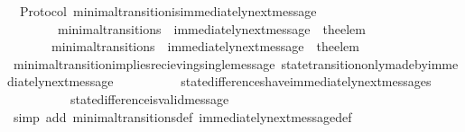 \begin{isabellebody}
\isanewline
%
\endisadelimproof
\isanewline
\isanewline
{}\isamarkupfalse%
\ {\isacharparenleft}\ Protocol{\isacharparenright}\ minimal{\isacharunderscore}transition{\isacharunderscore}is{\isacharunderscore}immediately{\isacharunderscore}next{\isacharunderscore}message\ {\isacharcolon}\isanewline
\ \ {\isachardoublequoteopen}{\isasymforall}\ {\isasymsigma}\ {\isasymsigma}{\isacharprime}{\isachardot}\ {\isacharparenleft}{\isasymsigma}{\isacharcomma}\ {\isasymsigma}{\isacharprime}{\isacharparenright}\ {\isasymin}\ minimal{\isacharunderscore}transitions\ {\isasymlongleftrightarrow}\ immediately{\isacharunderscore}next{\isacharunderscore}message\ {\isacharparenleft}{\isasymsigma}{\isacharcomma}\ the{\isacharunderscore}elem\ {\isacharparenleft}{\isasymsigma}{\isacharprime}{\isacharminus}\ {\isasymsigma}{\isacharparenright}{\isacharparenright}{\isachardoublequoteclose}\isanewline
%
\isadelimproof
%
\endisadelimproof
%
\isatagproof
{}\isamarkupfalse%
\ {\isacharminus}\isanewline
\ \ \isamarkupfalse%
\ {\isachardoublequoteopen}{\isasymforall}\ {\isasymsigma}\ {\isasymsigma}{\isacharprime}{\isachardot}\ {\isacharparenleft}{\isasymsigma}{\isacharcomma}\ {\isasymsigma}{\isacharprime}{\isacharparenright}\ {\isasymin}\ minimal{\isacharunderscore}transitions\ {\isasymlongrightarrow}\ immediately{\isacharunderscore}next{\isacharunderscore}message\ {\isacharparenleft}{\isasymsigma}{\isacharcomma}\ the{\isacharunderscore}elem\ {\isacharparenleft}{\isasymsigma}{\isacharprime}{\isacharminus}\ {\isasymsigma}{\isacharparenright}{\isacharparenright}{\isachardoublequoteclose}\isanewline
\ \ \ \ \isamarkupfalse%
\ minimal{\isacharunderscore}transition{\isacharunderscore}implies{\isacharunderscore}recieving{\isacharunderscore}single{\isacharunderscore}message\ state{\isacharunderscore}transition{\isacharunderscore}only{\isacharunderscore}made{\isacharunderscore}by{\isacharunderscore}immediately{\isacharunderscore}next{\isacharunderscore}message\isanewline
\ \ \ \ \ \ \ \ \ \ state{\isacharunderscore}differences{\isacharunderscore}have{\isacharunderscore}immediately{\isacharunderscore}next{\isacharunderscore}messages\isanewline
\ \ \ \ \ \ \ \ \ \ state{\isacharunderscore}difference{\isacharunderscore}is{\isacharunderscore}valid{\isacharunderscore}message\isanewline
\ \ \ \ \isamarkupfalse%
\ {\isacharparenleft}simp\ add{\isacharcolon}\ minimal{\isacharunderscore}transitions{\isacharunderscore}def\ immediately{\isacharunderscore}next{\isacharunderscore}message{\isacharunderscore}def{\isacharparenright}\isanewline
\ \ \ \ \isanewline
{}\isamarkupfalse%
%
\endisatagproof
{\isafoldproof}%
%
\isadelimproof
\isanewline
%
\endisadelimproof
%
\isadelimtheory
\ \ \ \ \isanewline
%
\endisadelimtheory
%
\isatagtheory
{}\isamarkupfalse%
%
\endisatagtheory
{\isafoldtheory}%
%
\isadelimtheory
%
\endisadelimtheory
%
\end{isabellebody}%

